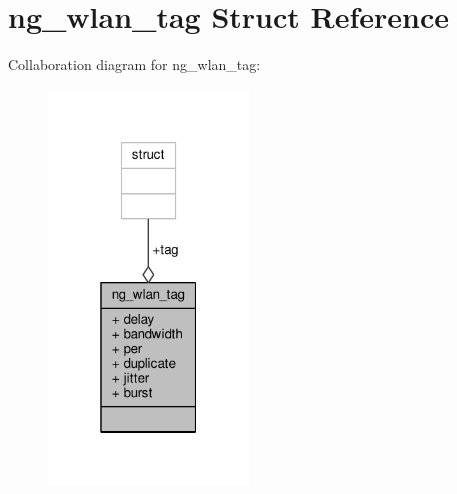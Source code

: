 \hypertarget{structng__wlan__tag}{\section{ng\+\_\+wlan\+\_\+tag Struct Reference}
\label{structng__wlan__tag}
}


Collaboration diagram for ng\+\_\+wlan\+\_\+tag\+:
\nopagebreak
\begin{figure}[H]
\begin{center}
\leavevmode
\includegraphics[width=151pt]{structng__wlan__tag__coll__graph}
\end{center}
\end{figure}
